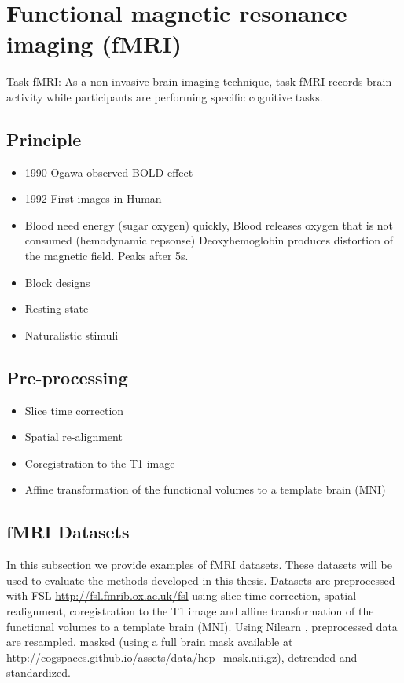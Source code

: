 \section{Functional magnetic resonance imaging (fMRI)}
Task fMRI:
As a non-invasive brain imaging technique, task fMRI records brain
activity while participants are
performing specific cognitive tasks.

\subsection{Principle}
\begin{itemize}
\item 1990 Ogawa observed BOLD effect
\item 1992 First images in Human
  \item Blood need energy (sugar oxygen) quickly, Blood releases oxygen that is
    not consumed (hemodynamic repsonse) Deoxyhemoglobin produces distortion of
    the magnetic field. Peaks after 5s.
  \item Block designs
  \item Resting state
    \item Naturalistic stimuli
\end{itemize}
\subsection{Pre-processing}
\begin{itemize}
\item Slice time correction
\item Spatial re-alignment
\item Coregistration to the T1 image
\item Affine transformation of the functional volumes to a template brain (MNI)
\end{itemize}
\subsection{fMRI Datasets}
\label{srm:datasets:fmri}
In this subsection we provide examples of fMRI datasets. These datasets will be
used to evaluate the methods developed in this thesis.
Datasets are preprocessed with FSL \url{http://fsl.fmrib.ox.ac.uk/fsl} using slice time correction, spatial realignment, coregistration to the T1 image and affine transformation of the functional volumes to a template brain (MNI).
Using Nilearn \cite{abraham2014machine}, preprocessed data are resampled, masked
(using a full brain mask available at \url{http://cogspaces.github.io/assets/data/hcp_mask.nii.gz}), detrended and standardized.

